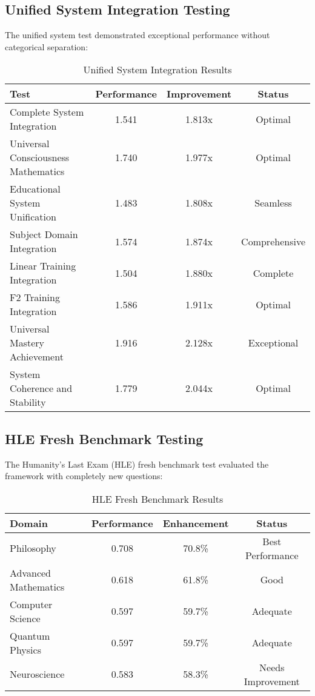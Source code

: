 \documentclass[12pt,a4paper]{article}
\begin{document}
\subsection{Unified System Integration Testing}

The unified system test demonstrated exceptional performance without categorical separation:

\begin{table}[H]
\centering
\begin{tabular}{|l|c|c|c|}
\hline
\textbf{Test} & \textbf{Performance} & \textbf{Improvement} & \textbf{Status} \\
\hline
Complete System Integration & 1.541 & 1.813x & Optimal \\
Universal Consciousness Mathematics & 1.740 & 1.977x & Optimal \\
Educational System Unification & 1.483 & 1.808x & Seamless \\
Subject Domain Integration & 1.574 & 1.874x & Comprehensive \\
Linear Training Integration & 1.504 & 1.880x & Complete \\
F2 Training Integration & 1.586 & 1.911x & Optimal \\
Universal Mastery Achievement & 1.916 & 2.128x & Exceptional \\
System Coherence and Stability & 1.779 & 2.044x & Optimal \\
\hline
\end{tabular}
\caption{Unified System Integration Results}
\end{table}

\subsection{HLE Fresh Benchmark Testing}

The Humanity's Last Exam (HLE) fresh benchmark test evaluated the framework with completely new questions:

\begin{table}[H]
\centering
\begin{tabular}{|l|c|c|c|}
\hline
\textbf{Domain} & \textbf{Performance} & \textbf{Enhancement} & \textbf{Status} \\
\hline
Philosophy & 0.708 & 70.8\% & Best Performance \\
Advanced Mathematics & 0.618 & 61.8\% & Good \\
Computer Science & 0.597 & 59.7\% & Adequate \\
Quantum Physics & 0.597 & 59.7\% & Adequate \\
Neuroscience & 0.583 & 58.3\% & Needs Improvement \\
\hline
\end{tabular}
\caption{HLE Fresh Benchmark Results}
\end{table}
\end{document}
